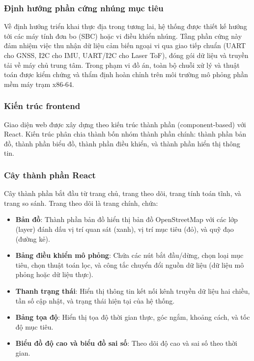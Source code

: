 \subsubsection{Định hướng phần cứng nhúng mục tiêu}

\hspace{0.5cm} Về định hướng triển khai thực địa trong tương lai, hệ thống được thiết kế hướng tới các máy tính đơn bo (SBC) hoặc vi điều khiển nhúng. Tầng phần cứng này đảm nhiệm việc thu nhận dữ liệu cảm biến ngoại vi qua giao tiếp chuẩn (UART cho GNSS, I2C cho IMU, UART/I2C cho Laser ToF), đóng gói dữ liệu và truyền tải về máy chủ trung tâm. Trong phạm vi đồ án, toàn bộ chuỗi xử lý và thuật toán được kiểm chứng và thẩm định hoàn chỉnh trên môi trường mô phỏng phần mềm máy trạm x86-64.

\subsubsection{Kiến trúc frontend}

\hspace{0.5cm} Giao diện web được xây dựng theo kiến trúc thành phần (component-based) với React. Kiến trúc phân chia thành bốn nhóm thành phần chính: thành phần bản đồ, thành phần biểu đồ, thành phần điều khiển, và thành phần hiển thị thông tin.

\subsubsection{Cây thành phần React}

\hspace{0.5cm} Cây thành phần bắt đầu từ trang chủ, trang theo dõi, trang tính toán tĩnh, và trang so sánh. Trang theo dõi là trang chính, chứa:

\begin{itemize}
    \item \textbf{Bản đồ}: Thành phần bản đồ hiển thị bản đồ OpenStreetMap với các lớp (layer) đánh dấu vị trí quan sát (xanh), vị trí mục tiêu (đỏ), và quỹ đạo (đường kẻ).
    \item \textbf{Bảng điều khiển mô phỏng}: Chứa các nút bắt đầu/dừng, chọn loại mục tiêu, chọn thuật toán lọc, và công tắc chuyển đổi nguồn dữ liệu (dữ liệu mô phỏng hoặc dữ liệu thực).
    \item \textbf{Thanh trạng thái}: Hiển thị thông tin kết nối kênh truyền dữ liệu hai chiều, tần số cập nhật, và trạng thái hiện tại của hệ thống.
    \item \textbf{Bảng tọa độ}: Hiển thị tọa độ thời gian thực, góc ngắm, khoảng cách, và tốc độ mục tiêu.
    \item \textbf{Biểu đồ độ cao và biểu đồ sai số}: Theo dõi độ cao và sai số theo thời gian.
\end{itemize}

